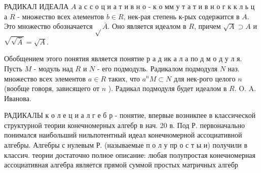 \documentclass[10pt]{article}
\begin{document}
РАДИКАЛ ИДЕАЛА $A$ а с с о ц и а т и в н $о$ - к о мм у т а т и в н о г к к л ь ц а $R$ - множество всех әлементов $b \in R$, нек-рая степень к-рых содержится в $A$. Это множество обозначается $\sqrt{ } \bar{A}$. Оно является идеалом в $R$, причем $\sqrt{A} \supset A$ и $\sqrt{\sqrt{\bar{A}}}=\sqrt{A}$.



Обобщением этого понятия является понятие р а д ик а л а по д м о д у л я. Пусть $M$ - модуль над $R$ и $N$ - его подмодуль. Радикалом подмодуля $N$ наз. множество всех элементов $a \in R$ таких, что $a^{n} M \subset N$ для нек-рого целого $n$ (вообще говоря, зависящего от $n$ ). Радикал подмодуля будет идеалом в $R$. O. A. Иванова.



РАДИКАЛЫ к о л е ц и а л г е б р - понятие, впервые возникпее в классической структурной теории конечномерных алгебр в нач. 20 в. Под Р. первоначально понимался наибольший нильпотентный идеал конечномерной ассоциативной алгебры. Алгебры с нулевым Р. (называемые п о л у пр о с т ы и) получили в классич. теории достаточно полное описание: любая полупростая конечномерная ассоциативная алгебра является прямой суммой простых матричных алгебр
\end{document}

